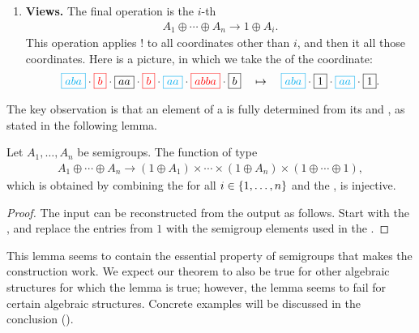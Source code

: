 \begin{enumerate}
        \item \AP \textbf{Views.} The final operation is the $i$-th 
        \begin{align*}
        A_1 \oplus \cdots \oplus A_n \to 1 \oplus A_i.
        \end{align*}
        This operation applies $!$ to all coordinates other than $i$, and then it  all those coordinates. Here is a picture, in which we take the  of the  coordinate:
        \begin{align*}
            {\color{cyan}\boxed{aba}} \cdot 
            {\color{red}\boxed{b}} \cdot 
            \boxed{aa} \cdot 
            {\color{red}\boxed{b}} \cdot 
            {\color{cyan}\boxed{aa}} \cdot 
            {\color{red}\boxed{abba}} \cdot 
            \boxed{b}
            \quad \mapsto \quad  
            {\color{cyan}\boxed{aba}} \cdot 
            {\boxed{1}} \cdot 
            {\color{cyan}\boxed{aa}} \cdot 
            \boxed{1}.
        \end{align*}
        
\end{enumerate}


The key observation is that an element of a  is fully determined from its  and , as stated in the following lemma. 

\begin{proposition}
\label{prop:views} Let $A_1,\ldots,A_n$ be semigroups. The  function of type
\begin{align*}
A_1 \oplus \cdots \oplus A_n \longrightarrow (1 \oplus A_1) \times \cdots \times (1 \oplus A_n) \times (1 \oplus \cdots \oplus 1),
\end{align*}
which is obtained by combining the  for all $i \in \{1,\ldots,n\}$ and the , is injective. 
\end{proposition}
\begin{proof}
    The input can be reconstructed from the output as follows.
    Start with the , and replace the entries from $1$ with the semigroup elements used in the .
\end{proof}
This lemma seems to contain the essential property of semigroups that makes the construction work. We expect our theorem to also be true for other algebraic structures for which the lemma is true; however, the lemma seems to fail for certain algebraic structures. Concrete examples will be discussed in the conclusion ().

